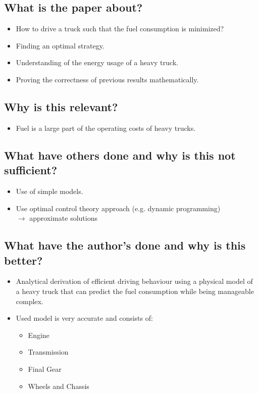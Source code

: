 \documentclass[paper=a4, fontsize=11pt]{scrartcl} %
\numberwithin{equation}{section} %
\numberwithin{figure}{section} %
\numberwithin{table}{section} %
\begin{document}
\subsection{What is the paper about?}
\begin{itemize}
	\item How to drive a truck such that the fuel consumption is minimized?
	\item Finding an optimal strategy.
	\item Understanding of the energy usage of a heavy truck.
	\item Proving the correctness of previous results mathematically.
\end{itemize}

\subsection{Why is this relevant?}
\begin{itemize}
	\item Fuel is a large part of the operating costs of heavy trucks.
\end{itemize}

\subsection{What have others done and why is this not sufficient?}
\begin{itemize}
	\item Use of simple models.
	\item Use optimal control theory approach (e.g. dynamic programming)\\ $\rightarrow$ approximate solutions	
\end{itemize}

\subsection{What have the author's done and why is this better?}
\begin{itemize}
	\item Analytical derivation of efficient driving behaviour using a physical model of a heavy truck that can predict the fuel consumption while being manageable complex.
	\item Used model is very accurate and consists of:
	\begin{itemize}
		\item Engine
		\item Transmission
		\item Final Gear
		\item Wheels and Chassis
	\end{itemize}
\end{itemize}
\end{document}
